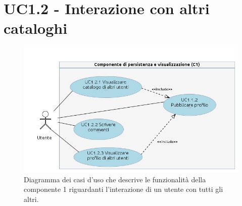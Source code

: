 \section{UC1.2 - Interazione con altri cataloghi}
\begin{figure}[h]
  \centering
  \includegraphics[width=15cm]{img/AR/UC1_2.png}
\caption{Diagramma dei casi d'uso che descrive le funzionalit\`a della componente
1 riguardanti l'interazione di un utente con tutti gli altri.}
\end{figure}

